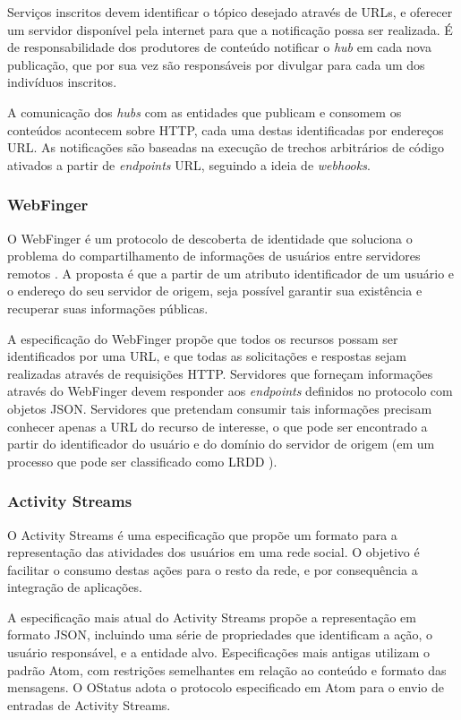 Serviços inscritos devem identificar o tópico desejado através de URLs, e oferecer
um servidor disponível pela internet para que a notificação possa ser realizada.
É de responsabilidade dos produtores de conteúdo notificar o \textit{hub} em cada
nova publicação, que por sua vez são responsáveis por divulgar para cada um dos
indivíduos inscritos.

A comunicação dos \textit{hubs} com as entidades que publicam e consomem os
conteúdos acontecem sobre HTTP, cada uma destas identificadas por endereços URL. As
notificações são baseadas na execução de trechos arbitrários de código ativados a
partir de \textit{endpoints} URL, seguindo a ideia de \textit{webhooks}.

\subsubsection{WebFinger}

O WebFinger é um protocolo de descoberta de identidade que soluciona o problema do
compartilhamento de informações de usuários entre servidores remotos \cite{rfc7033}.
A proposta é que a partir de um atributo identificador de um usuário e o endereço do
seu servidor de origem, seja possível garantir sua existência e recuperar suas
informações públicas.

A especificação do WebFinger propõe que todos os recursos possam ser identificados
por uma URL, e que todas as solicitações e respostas sejam realizadas através de
requisições HTTP. Servidores que forneçam informações através do WebFinger devem
responder aos \textit{endpoints} definidos no protocolo com objetos JSON. Servidores
que pretendam consumir tais informações precisam conhecer apenas a URL do recurso de
interesse, o que pode ser encontrado a partir do identificador do usuário e do
domínio do servidor de origem (em um processo que pode ser classificado como LRDD
\cite{lrdd2010}). 

\subsubsection{Activity Streams}

O Activity Streams é uma especificação que propõe um formato para a representação
das atividades dos usuários em uma rede social. O objetivo é facilitar o consumo
destas ações para o resto da rede, e por consequência a integração de aplicações.

A especificação mais atual do Activity Streams propõe a representação em formato
JSON, incluindo uma série de propriedades que identificam a ação, o usuário
responsável, e a entidade alvo. Especificações mais antigas utilizam o padrão Atom,
com restrições semelhantes em relação ao conteúdo e formato das mensagens. O OStatus
adota o protocolo especificado em Atom para o envio de entradas de Activity Streams.


